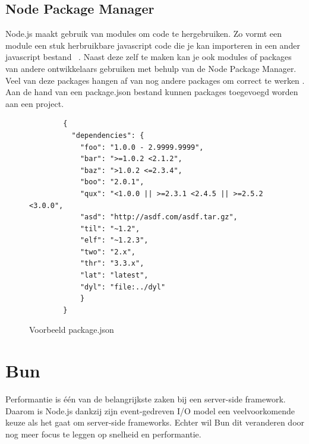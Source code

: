 \subsection{Node Package Manager}
Node.js maakt gebruik van modules om code te hergebruiken. 
Zo vormt een module een stuk herbruikbare javascript code 
die je kan importeren in een ander javascript bestand ~\autocite{Semah2022}.
Naast deze zelf te maken kan je ook modules of packages van andere ontwikkelaars gebruiken met behulp van de Node Package Manager.
Veel van deze packages hangen af van nog andere packages om correct te werken \autocite{kula2017}.
Aan de hand van een package.json bestand kunnen packages toegevoegd worden aan een project.
\begin{figure}[h!]
    \centering
    \begin{verbatim}
        {
          "dependencies": {
            "foo": "1.0.0 - 2.9999.9999",
            "bar": ">=1.0.2 <2.1.2",
            "baz": ">1.0.2 <=2.3.4",
            "boo": "2.0.1",
            "qux": "<1.0.0 || >=2.3.1 <2.4.5 || >=2.5.2 <3.0.0",
            "asd": "http://asdf.com/asdf.tar.gz",
            "til": "~1.2",
            "elf": "~1.2.3",
            "two": "2.x",
            "thr": "3.3.x",
            "lat": "latest",
            "dyl": "file:../dyl"
            }
        }
        \end{verbatim}
        \caption{Voorbeeld package.json \autocite{Kaplan2024}}
\end{figure}

\section{Bun}
Performantie is één van de belangrijkste zaken bij een server-side framework. 
Daarom is Node.js dankzij zijn event-gedreven I/O model een veelvoorkomende keuze als het gaat om server-side frameworks.
Echter wil Bun dit veranderen door nog meer focus te leggen op snelheid en performantie.

